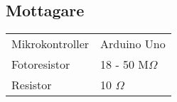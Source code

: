     \subsection{Mottagare} %
    \label{sub:mottagare}
      \begin{tabularx}{\textwidth}{@{}lX}
        Mikrokontroller & Arduino Uno \\
        Fotoresistor & 18 - 50 M$\Omega$ \\
        Resistor & 10\thinspace000 $\Omega$
        
    \end{tabularx}

